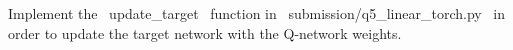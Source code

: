 \item {}
Implement the ~update_target~ function in ~submission/q5_linear_torch.py~ in order to update the target network with the Q-network weights.